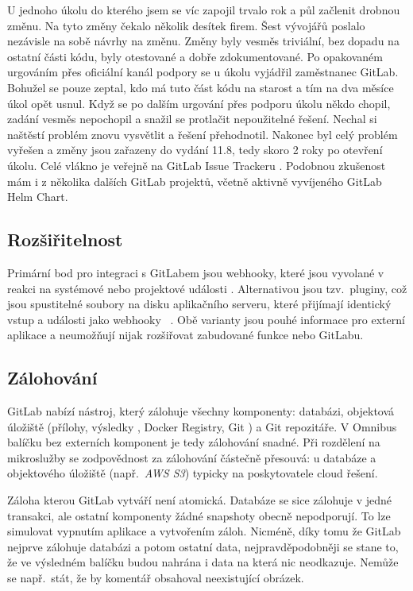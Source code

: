         U jednoho úkolu do kterého jsem se víc zapojil trvalo rok a půl začlenit drobnou změnu. Na tyto změny čekalo několik desítek firem. Šest vývojářů poslalo nezávisle na sobě návrhy na změnu. Změny byly vesměs triviální, bez dopadu na ostatní části kódu, byly otestované a dobře zdokumentované. Po opakovaném urgováním přes oficiální kanál podpory se u úkolu vyjádřil zaměstnanec GitLab. Bohužel se pouze zeptal, kdo má tuto část kódu na starost a tím na dva měsíce úkol opět usnul. Když se po dalším urgování přes podporu úkolu někdo chopil, zadání vesměs nepochopil a snažil se protlačit nepoužitelné řešení. Nechal si naštěstí problém znovu vysvětlit a řešení přehodnotil. Nakonec byl celý problém vyřešen a změny jsou zařazeny do vydání 11.8, tedy skoro 2 roky po otevření úkolu. Celé vlákno je veřejně na GitLab Issue Trackeru \cite{gitlab-issue-slow}. Podobnou zkušenost mám i z několika dalších GitLab projektů, včetně aktivně vyvíjeného GitLab Helm Chart.

    \subsection{Rozšiřitelnost}
        Primární bod pro integraci s GitLabem jsou webhooky, které jsou vyvolané v reakci na systémové nebo projektové události \cite{gitlab-webhooks}. Alternativou jsou tzv.~pluginy, což jsou spustitelné soubory na disku aplikačního serveru, které přijímají identický vstup a události jako webhooky ~\cite{gitlab-plugins}. Obě varianty jsou pouhé informace pro externí aplikace a neumožňují nijak rozšiřovat zabudované funkce nebo  GitLabu.

    \subsection{Zálohování}
        GitLab nabízí nástroj, který zálohuje všechny komponenty: databázi, objektová úložiště (přílohy, výsledky \CICD, Docker Registry, Git ) a Git repozitáře. V Omnibus balíčku bez externích komponent je tedy zálohování snadné. Při rozdělení na mikroslužby se zodpovědnost za zálohování částečně přesouvá: u databáze a objektového úložiště (např.~\textit{AWS S3}) typicky na poskytovatele cloud řešení.

        Záloha kterou GitLab vytváří není atomická. Databáze se sice zálohuje v jedné transakci, ale ostatní komponenty žádné snapshoty obecně nepodporují. To lze simulovat vypnutím aplikace a vytvořením záloh. Nicméně, díky tomu že GitLab nejprve zálohuje databázi a potom ostatní data, nejpravděpodobněji se stane to, že ve výsledném balíčku budou nahrána i data na která nic neodkazuje. Nemůže se např.~stát, že by komentář obsahoval neexistující obrázek.

